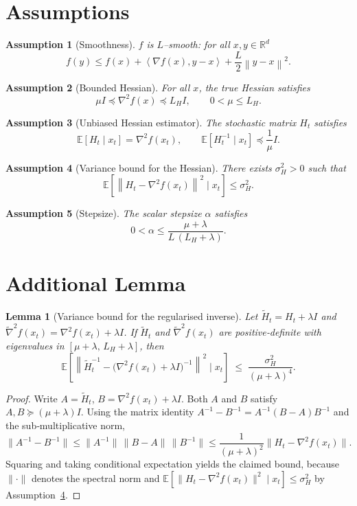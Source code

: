 \documentclass{article}
\newtheorem{lemma}{Lemma}
\newtheorem{assumption}{Assumption}
\newcommand{\E}{\mathbb{E}}
\newcommand{\R}{\mathbb{R}}
\newcommand{\norm}[1]{\left\lVert #1 \right\rVert}
\newcommand{\ip}[2]{\left\langle #1, #2 \right\rangle}
\begin{document}
\section*{Assumptions}
\begin{assumption}[Smoothness]\label{ass:smooth}
$f$ is $L$–smooth: for all $x,y\in\R^{d}$
\[
f(y)\le f(x)+\ip{\nabla f(x)}{y-x}+\frac{L}{2}\norm{y-x}^{2}.
\]
\end{assumption}
\begin{assumption}[Bounded Hessian]\label{ass:hessian}
For all $x$, the true Hessian satisfies
\[
\mu I \preceq \nabla^{2}f(x) \preceq L_{H} I,
\qquad 0<\mu\le L_{H}.
\]
\end{assumption}
\begin{assumption}[Unbiased Hessian estimator]\label{ass:unbiased}
The stochastic matrix $H_{t}$ satisfies
\[
\E[H_{t}\mid x_{t}] = \nabla^{2}f(x_{t}),\qquad
\E[H_{t}^{-1}\mid x_{t}] \preceq \frac{1}{\mu}I .
\]
\end{assumption}
\begin{assumption}[Variance bound for the Hessian]\label{ass:variance}
There exists $\sigma_{H}^{2}>0$ such that
\[
\E\!\left[\norm{H_{t}-\nabla^{2}f(x_{t})}^{2}\mid x_{t}\right]\le\sigma_{H}^{2}.
\]
\end{assumption}
\begin{assumption}[Stepsize]\label{ass:stepsize}
The scalar stepsize $\alpha$ satisfies
\[
0<\alpha\le \frac{\mu+\lambda}{L\,(L_{H}+\lambda)} .
\tag{A5}
\]
\end{assumption}

\section*{Additional Lemma}
\begin{lemma}[Variance bound for the regularised inverse]\label{lem:inv-variance}
Let $\tilde H_{t}=H_{t}+\lambda I$ and $\tilde \nabla^{2}f(x_{t})=\nabla^{2}f(x_{t})+\lambda I$.  
If $\tilde H_{t}$ and $\tilde \nabla^{2}f(x_{t})$ are positive‑definite with eigenvalues in $[\mu+\lambda,\,L_{H}+\lambda]$, then
\[
\E\!\left[\norm{\tilde H_{t}^{-1}-\bigl(\nabla^{2}f(x_{t})+\lambda I\bigr)^{-1}}^{2}\mid x_{t}\right]
\;\le\;
\frac{\sigma_{H}^{2}}{(\mu+\lambda)^{4}} .
\]
\end{lemma}
\begin{proof}
Write $A=\tilde H_{t}$, $B=\nabla^{2}f(x_{t})+\lambda I$.  
Both $A$ and $B$ satisfy $A,B\succeq (\mu+\lambda)I$.  
Using the matrix identity $A^{-1}-B^{-1}=A^{-1}(B-A)B^{-1}$ and the sub‑multiplicative norm,
\[
\|A^{-1}-B^{-1}\|
\le \|A^{-1}\|\,\|B-A\|\,\|B^{-1}\|
\le \frac{1}{(\mu+\lambda)^{2}}\|H_{t}-\nabla^{2}f(x_{t})\|.
\]
Squaring and taking conditional expectation yields the claimed bound, because $\| \cdot \|$ denotes the spectral norm and $\E[\|H_{t}-\nabla^{2}f(x_{t})\|^{2}\mid x_{t}]\le\sigma_{H}^{2}$ by Assumption~\ref{ass:variance}. \hfill\qedsymbol
\end{proof}
\end{document}
